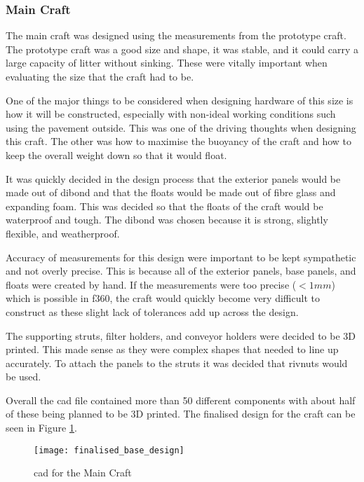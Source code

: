 \documentclass [11pt]{article}
\begin{document}
\subsubsection{Main Craft}\label{sec:main_craft_cad}

The main craft was designed using the measurements from the prototype craft. The prototype craft was a good size and shape, it was stable, and it could carry a large capacity of litter without sinking. These were vitally important when evaluating the size that the craft had to be. 

One of the major things to be considered when designing hardware of this size is how it will be constructed, especially with non-ideal working conditions such using the pavement outside.  This was one of the driving thoughts when designing this craft. The other was how to maximise the buoyancy of the craft and how to keep the overall weight down so that it would float. 

It was quickly decided in the design process that the exterior panels would be made out of \gls{dibond} and that the floats would be made out of fibre glass and expanding foam. This was decided so that the floats of the craft would be waterproof and tough. The \gls{dibond} was chosen because it is strong, slightly flexible, and weatherproof. 

Accuracy of measurements for this design were important to be kept sympathetic and not overly precise. This is because all of the exterior panels, base panels, and floats were created by hand. If the measurements were too precise ($<1mm$) which is possible in \gls{f360}, the craft would quickly become very difficult to construct as these slight lack of tolerances add up across the design.

The supporting struts, filter holders, and conveyor holders were decided to be 3D printed. This made sense as they were complex shapes that needed to line up accurately. To attach the panels to the struts it was decided that \gls{rivnut}s would be used. 

Overall the \gls{cad} file contained more than 50 different components with about half of these being planned to be 3D printed. The finalised design for the craft can be seen in Figure \ref{fig:finalised_base_design}. 

\begin{figure}[H]
\centerline{\texttt{[image: finalised\_base\_design]}}
\caption{\gls{cad} for the Main Craft}
\label{fig:finalised_base_design}
\end{figure}
\end{document}
